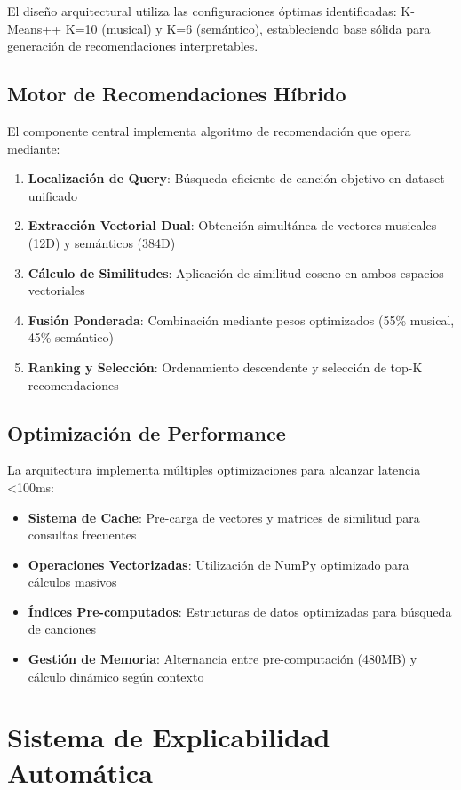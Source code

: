 \documentclass[12pt,a4paper]{report}
\begin{document}
El diseño arquitectural utiliza las configuraciones óptimas identificadas: K-Means++ K=10 (musical) y K=6 (semántico), estableciendo base sólida para generación de recomendaciones interpretables.

\subsection{Motor de Recomendaciones Híbrido}

El componente central implementa algoritmo de recomendación que opera mediante:

\begin{enumerate}
\item \textbf{Localización de Query}: Búsqueda eficiente de canción objetivo en dataset unificado
\item \textbf{Extracción Vectorial Dual}: Obtención simultánea de vectores musicales (12D) y semánticos (384D)
\item \textbf{Cálculo de Similitudes}: Aplicación de similitud coseno en ambos espacios vectoriales
\item \textbf{Fusión Ponderada}: Combinación mediante pesos optimizados (55\% musical, 45\% semántico)
\item \textbf{Ranking y Selección}: Ordenamiento descendente y selección de top-K recomendaciones
\end{enumerate}

\subsection{Optimización de Performance}

La arquitectura implementa múltiples optimizaciones para alcanzar latencia <100ms:

\begin{itemize}
\item \textbf{Sistema de Cache}: Pre-carga de vectores y matrices de similitud para consultas frecuentes
\item \textbf{Operaciones Vectorizadas}: Utilización de NumPy optimizado para cálculos masivos
\item \textbf{Índices Pre-computados}: Estructuras de datos optimizadas para búsqueda de canciones
\item \textbf{Gestión de Memoria}: Alternancia entre pre-computación (480MB) y cálculo dinámico según contexto
\end{itemize}

\section{Sistema de Explicabilidad Automática}
\end{document}
